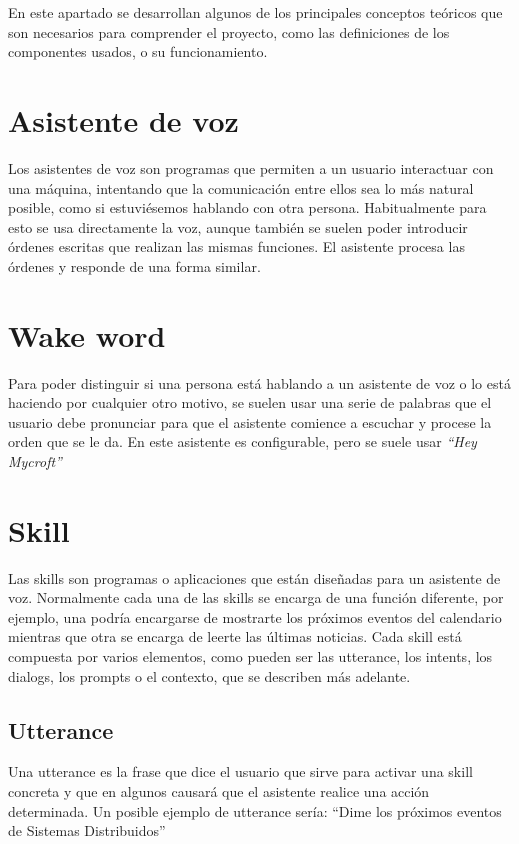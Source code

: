 
En este apartado se desarrollan algunos de los principales conceptos teóricos que son necesarios para comprender el proyecto, como las definiciones de los componentes usados, o su funcionamiento.

\section{Asistente de voz}
Los asistentes de voz son programas que permiten a un usuario interactuar con una máquina, intentando que la comunicación entre ellos sea lo más natural posible, como si estuviésemos hablando con otra persona. Habitualmente para esto se usa directamente la voz, aunque también se suelen poder introducir órdenes escritas que realizan las mismas funciones. El asistente procesa las órdenes y responde de una forma similar.

\section{Wake word}
Para poder distinguir si una persona está hablando a un asistente de voz o lo está haciendo por cualquier otro motivo, se suelen usar una serie de palabras que el usuario debe pronunciar para que el asistente comience a escuchar y procese la orden que se le da. En este asistente es configurable, pero se suele usar \textit{``Hey Mycroft''}

\section{Skill}
Las skills son programas o aplicaciones que están diseñadas para un asistente de voz. Normalmente cada una de las skills se encarga de una función diferente, por ejemplo, una podría encargarse de mostrarte los próximos eventos del calendario mientras que otra se encarga de leerte las últimas noticias. Cada skill está compuesta por varios elementos, como pueden ser las utterance, los intents, los dialogs, los prompts o el contexto, que se describen más adelante.

\subsection{Utterance}
Una utterance es la frase que dice el usuario que sirve para activar una skill concreta y que en algunos causará que el asistente realice una acción determinada. Un posible ejemplo de utterance sería: ``Dime los próximos eventos de Sistemas Distribuidos''

